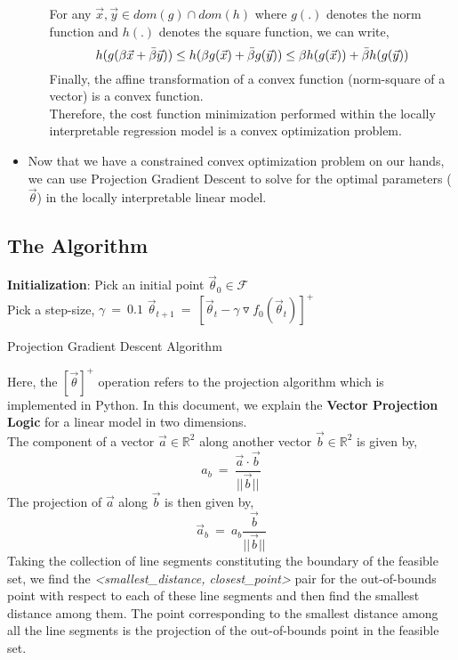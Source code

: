 \documentclass{article}
\begin{document}
\begin{itemize}
\begin{itemize}
        For any $\vec{x}, \vec{y} \in dom(g) \cap dom(h)$ where $g(.)$ denotes the norm function and $h(.)$ denotes the square function, we can write,
        \[h(g(\beta \vec{x} + \Bar{\beta} \vec{y})) \leq h(\beta g(\vec{x}) + \Bar{\beta} g(\vec{y})) \leq \beta h(g(\vec{x})) + \Bar{\beta} h(g(\vec{y}))\]
        Finally, the affine transformation of a convex function (norm-square of a vector) is a convex function.
        \\Therefore, the cost function minimization performed within the locally interpretable regression model is a convex optimization problem.
    \end{itemize}
    \item Now that we have a constrained convex optimization problem on our hands, we can use Projection Gradient Descent to solve for the optimal parameters ($\vec{\theta}$) in the locally interpretable linear model.
\end{itemize}
\subsection{The Algorithm}
\begin{algorithm}[H]
\SetAlgoLined
\textbf{Initialization}: Pick an initial point $\vec{\theta}_0 \in \mathcal{F}$\;
\\Pick a step-size, $\gamma\ =\ 0.1$\newline
{}
{
    $\vec{\theta}_{t+1}\ =\ [\vec{\theta}_t - \gamma \triangledown f_0(\vec{\theta}_t)]^+$\;
}
\caption{Projection Gradient Descent Algorithm}
\end{algorithm}
Here, the $[\vec{\theta}]^+$ operation refers to the projection algorithm which is implemented in Python. In this document, we explain the \textbf{Vector Projection Logic} for a linear model in two dimensions.
\\The component of a vector $\vec{a} \in \mathbb{R}^2$ along another vector $\vec{b} \in \mathbb{R}^2$ is given by,
\[a_b\ =\ \frac{\vec{a} \cdot \vec{b}}{||\vec{b}||}\]
The projection of $\vec{a}$ along $\vec{b}$ is then given by,
\[\vec{a}_b\ =\ a_b \frac{\vec{b}}{||\vec{b}||}\]
Taking the collection of line segments constituting the boundary of the feasible set, we find the \textit{<smallest\_distance, closest\_point>} pair for the out-of-bounds point with respect to each of these line segments and then find the smallest distance among them. The point corresponding to the smallest distance among all the line segments is the projection of the out-of-bounds point in the feasible set.
\end{document}
